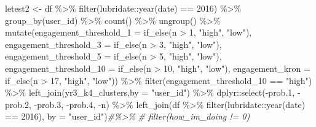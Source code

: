 \documentclass[
]{article}
\newenvironment{Shaded}{\begin{snugshade}}{\end{snugshade}}
\newcommand{\AttributeTok}[1]{\textcolor[rgb]{0.77,0.63,0.00}{#1}}
\newcommand{\CommentTok}[1]{\textcolor[rgb]{0.56,0.35,0.01}{\textit{#1}}}
\newcommand{\DecValTok}[1]{\textcolor[rgb]{0.00,0.00,0.81}{#1}}
\newcommand{\FloatTok}[1]{\textcolor[rgb]{0.00,0.00,0.81}{#1}}
\newcommand{\FunctionTok}[1]{\textcolor[rgb]{0.00,0.00,0.00}{#1}}
\newcommand{\NormalTok}[1]{#1}
\newcommand{\OtherTok}[1]{\textcolor[rgb]{0.56,0.35,0.01}{#1}}
\newcommand{\SpecialCharTok}[1]{\textcolor[rgb]{0.00,0.00,0.00}{#1}}
\newcommand{\StringTok}[1]{\textcolor[rgb]{0.31,0.60,0.02}{#1}}
\begin{document}
\begin{Shaded}
\begin{Highlighting}[]
\NormalTok{letest2 }\OtherTok{\textless{}{-}}\NormalTok{  df }\SpecialCharTok{\%\textgreater{}\%}
  \FunctionTok{filter}\NormalTok{(lubridate}\SpecialCharTok{::}\FunctionTok{year}\NormalTok{(date) }\SpecialCharTok{==} \DecValTok{2016}\NormalTok{) }\SpecialCharTok{\%\textgreater{}\%}
  \FunctionTok{group\_by}\NormalTok{(user\_id) }\SpecialCharTok{\%\textgreater{}\%}
  \FunctionTok{count}\NormalTok{() }\SpecialCharTok{\%\textgreater{}\%}
  \FunctionTok{ungroup}\NormalTok{() }\SpecialCharTok{\%\textgreater{}\%} 
  \FunctionTok{mutate}\NormalTok{(}\AttributeTok{engagement\_threshold\_1 =} \FunctionTok{if\_else}\NormalTok{(n }\SpecialCharTok{\textgreater{}} \DecValTok{1}\NormalTok{, }\StringTok{"high"}\NormalTok{, }\StringTok{"low"}\NormalTok{),}
         \AttributeTok{engagement\_threshold\_3 =} \FunctionTok{if\_else}\NormalTok{(n }\SpecialCharTok{\textgreater{}} \DecValTok{3}\NormalTok{, }\StringTok{"high"}\NormalTok{, }\StringTok{"low"}\NormalTok{),}
         \AttributeTok{engagement\_threshold\_5 =} \FunctionTok{if\_else}\NormalTok{(n }\SpecialCharTok{\textgreater{}} \DecValTok{5}\NormalTok{, }\StringTok{"high"}\NormalTok{, }\StringTok{"low"}\NormalTok{),}
         \AttributeTok{engagement\_threshold\_10 =} \FunctionTok{if\_else}\NormalTok{(n }\SpecialCharTok{\textgreater{}} \DecValTok{10}\NormalTok{, }\StringTok{"high"}\NormalTok{, }\StringTok{"low"}\NormalTok{),}
         \AttributeTok{engagement\_kron =} \FunctionTok{if\_else}\NormalTok{(n }\SpecialCharTok{\textgreater{}} \DecValTok{17}\NormalTok{, }\StringTok{"high"}\NormalTok{, }\StringTok{"low"}\NormalTok{)) }\SpecialCharTok{\%\textgreater{}\%} 
  \FunctionTok{filter}\NormalTok{(engagement\_threshold\_10 }\SpecialCharTok{==} \StringTok{"high"}\NormalTok{) }\SpecialCharTok{\%\textgreater{}\%} 
  \FunctionTok{left\_join}\NormalTok{(yr3\_k4\_clusters,}\AttributeTok{by =} \StringTok{"user\_id"}\NormalTok{) }\SpecialCharTok{\%\textgreater{}\%} 
\NormalTok{  dplyr}\SpecialCharTok{::}\FunctionTok{select}\NormalTok{(}\SpecialCharTok{{-}}\NormalTok{prob}\FloatTok{.1}\NormalTok{,}
          \SpecialCharTok{{-}}\NormalTok{prob}\FloatTok{.2}\NormalTok{,}
          \SpecialCharTok{{-}}\NormalTok{prob}\FloatTok{.3}\NormalTok{,}
          \SpecialCharTok{{-}}\NormalTok{prob}\FloatTok{.4}\NormalTok{,}
          \SpecialCharTok{{-}}\NormalTok{n) }\SpecialCharTok{\%\textgreater{}\%} 
  \FunctionTok{left\_join}\NormalTok{(df }\SpecialCharTok{\%\textgreater{}\%}
  \FunctionTok{filter}\NormalTok{(lubridate}\SpecialCharTok{::}\FunctionTok{year}\NormalTok{(date) }\SpecialCharTok{==} \DecValTok{2016}\NormalTok{),}
         \AttributeTok{by =} \StringTok{"user\_id"}\NormalTok{)}\CommentTok{\#\%\textgreater{}\%}
\CommentTok{\#  filter(how\_im\_doing != 0)}



\end{Highlighting}
\end{Shaded}
\end{document}
